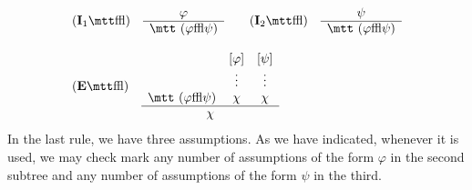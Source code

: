 \begin{equation}
\begin{array}{l}
\mbox{\rm (\textbf{I}$_1${\mtt\symbol{31}})}\quad
\begin{array}{c}
\varphi \\\hline
\mbox{\mtt ($\varphi$\symbol{31}$\psi$)}
\end{array}\qquad
\mbox{\rm (\textbf{I}$_2${\mtt\symbol{31}})}\quad
\begin{array}{c}
\psi \\\hline
\mbox{\mtt ($\varphi$\symbol{31}$\psi$)}
\end{array} \\
\\
\mbox{\rm (\textbf{E}{\mtt\symbol{31}})}\quad
\begin{array}{ccc}
    & [\varphi] & [\psi] \\
    & \vdots & \vdots \\
\mbox{\mtt ($\varphi$\symbol{31}$\psi$)} & \chi  & \chi\\\hline
\multicolumn{3}{c}{\chi}
\end{array}
\end{array}
\end{equation}
In the last rule, we have three assumptions. As we have indicated,
whenever it is used, we may check mark any number of assumptions
of the form $\varphi$ in the second subtree and any number of
assumptions of the form $\psi$ in the third.

